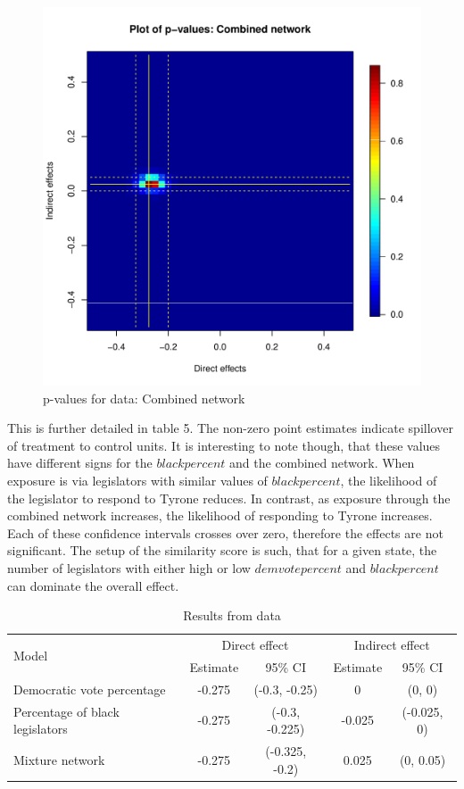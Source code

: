\documentclass[12pt]{article}
\begin{document}
\begin{figure}
\centering
\includegraphics[scale=0.45]{./images/pval_plot_broockman_demvotepct_blackpct.pdf}
\caption{p-values for \citet{broockman2013black} data: Combined network}
\end{figure}


This is further detailed in table 5. The non-zero point estimates indicate spillover of treatment to control units. It is interesting to note though, that these values have different signs for the $blackpercent$ and the combined network. When exposure is via legislators with similar values of $blackpercent$, the likelihood of the legislator to respond to Tyrone reduces. In contrast, as exposure through the combined network increases, the likelihood of responding to Tyrone increases. Each of these confidence intervals crosses over zero, therefore the effects are not significant. The setup of the similarity score is such, that for a given state, the number of legislators with either high or low $demvotepercent$ and $blackpercent$ can dominate the overall effect.


\begin{table}[h]
\centering
\begin{tabular}{lcccc}
\toprule
\multirow{2}{*}{Model} & \multicolumn{2}{c}{Direct effect} & \multicolumn{2}{c}{Indirect effect} \\
\cmidrule(l){2-3} \cmidrule(l){4-5}
 & Estimate & 95\% CI & Estimate & 95\% CI \\
\midrule
Democratic vote percentage & -0.275 & (-0.3, -0.25) &  0 & (0, 0)\\
Percentage of black legislators & -0.275 & (-0.3, -0.225) &  -0.025 & (-0.025, 0)\\
Mixture network & -0.275 & (-0.325, -0.2) &  0.025 & (0, 0.05)\\
\bottomrule
\end{tabular}
\caption{Results from \citet{broockman2013black} data}
\end{table}
\end{document}
